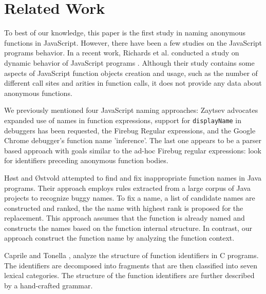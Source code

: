 \documentclass[10pt, preprint]{sigplanconf}
\begin{document}


\section{Related Work}

To best of our knowledge, this paper is the first study in naming anonymous functions in JavaScript. However, there have been a few studies on the JavaScript programs behavior. In a recent work, Richards et al. conducted a study on dynamic behavior of JavaScript programs \cite{Richards2}. Although their study contains some aspects of JavaScript function objects creation and usage, such as the number of different call sites and arities in function calls, it does not provide any data about anonymous functions. 

We previously mentioned four JavaScript naming approaches: Zaytsev advocates expanded use of names in function expressions\cite{Zaytsev}, support for \verb|displayName| in debuggers has been requested\cite{DisplayName}, the Firebug Regular expressions, and the Google Chrome debugger's function name 'inference'\cite{ChromeInfer}. The last one appears to be a parser based approach with goals similar to the ad-hoc Firebug regular expressions: look for identifiers preceding anonymous function bodies. 

H{\o}st and {\O}stvold \cite{Host} attempted to find and fix inappropriate function names in Java programs. Their approach employs rules extracted from a large corpus of Java projects to recognize buggy names. To fix a name, a list of candidate names are constructed and ranked, the the name with highest rank is proposed for the replacement. This approach assumes that the function is already named and constructs the names based on the function internal structure. In contrast, our approach construct the function name by analyzing the function context. 

Caprile and Tonella \cite{Caprile}, analyze the structure of function identifiers in C programs. The identifiers are decomposed into fragments that are then classified into seven lexical categories. The structure of the function identifiers are further described by a hand-crafted grammar.
\end{document}
